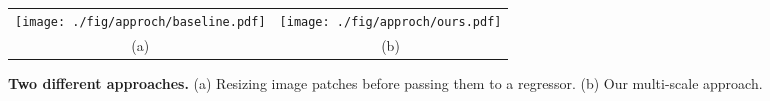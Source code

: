 
\begin{figure*}[t]
\centering
\begin{tabular}{cc}
\texttt{[image: ./fig/approch/baseline.pdf]}&
\texttt{[image: ./fig/approch/ours.pdf]}\\
(a) & (b) \\
\end{tabular}
\caption{{\bf Two different approaches.} (a) Resizing image patches before passing them to a regressor. (b) Our multi-scale approach. }
\label{fig:approach}
\end{figure*}